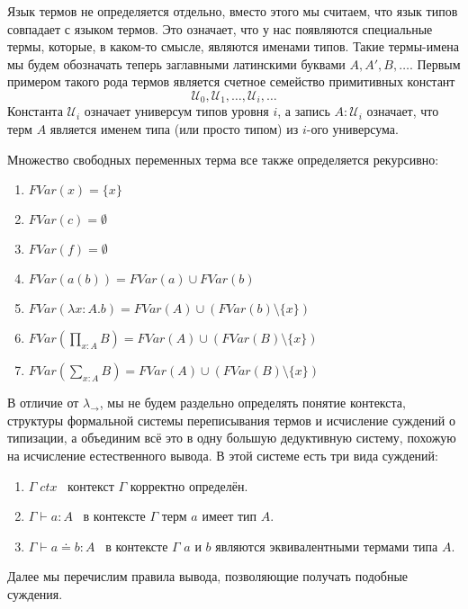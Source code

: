 \documentclass{article}[12pt]
\newcommand{\dash}{\textemdash\ }
\begin{document}
Язык термов не определяется отдельно, вместо этого мы считаем, что язык типов совпадает с языком термов.
Это означает, что у нас появляются специальные термы, которые, в каком-то смысле, являются именами типов.
Такие термы-имена мы будем обозначать теперь заглавными латинскими буквами $A, A', B, \dots$.
Первым примером такого рода термов является счетное семейство примитивных констант
$$\mathcal U_0, \mathcal U_1, \dots, \mathcal U_i, \dots$$
Константа $\mathcal U_i$ означает универсум типов уровня $i$, а запись $A : \mathcal U_i$ означает,
что терм $A$ является именем типа (или просто типом) из $i$-ого универсума.

Множество свободных переменных терма все также определяется рекурсивно:
\begin{enumerate}
    \item $FVar(x) = \{ x \}$
    \item $FVar(c) = \emptyset$
    \item $FVar(f) = \emptyset$
    \item $FVar(a(b)) = FVar(a) \cup FVar(b)$
    \item $FVar(\lambda x : A . b) = FVar(A) \cup (FVar(b) \setminus \{ x \})$
    \item $FVar(\prod \limits_{x : A} B) = FVar(A) \cup (FVar(B) \setminus \{ x \})$
    \item $FVar(\sum \limits_{x : A} B) = FVar(A) \cup (FVar(B) \setminus \{ x \})$
\end{enumerate}

В отличие от $\lambda_\rightarrow$, мы не будем раздельно определять понятие контекста, структуры формальной
системы переписывания термов и исчисление суждений о типизации, а объединим всё это
в одну большую дедуктивную систему, похожую на исчисление естественного вывода. В этой системе есть
три вида суждений:
\begin{enumerate}
    \item $\Gamma \; ctx$ \dash контекст $\Gamma$ корректно определён.
    \item $\Gamma \vdash a : A$ \dash в контексте $\Gamma$ терм $a$ имеет тип $A$.
    \item $\Gamma \vdash a \doteq b : A$ \dash в контексте $\Gamma$ $a$ и $b$ являются
    эквивалентными термами типа $A$.
\end{enumerate}
Далее мы перечислим правила вывода, позволяющие получать подобные суждения.
\end{document}
